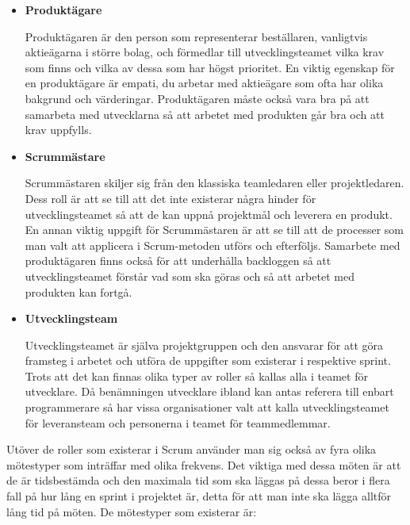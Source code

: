 \begin{itemize}
	\item \textbf{Produktägare}
	
	Produktägaren är den person som representerar beställaren, vanligtvis aktieägarna i större bolag, och förmedlar till utvecklingsteamet vilka krav som finns och vilka av dessa som har högst prioritet. En viktig egenskap för en produktägare är empati, du arbetar med aktieägare som ofta har olika bakgrund och värderingar. Produktägaren måste också vara bra på att samarbeta med utvecklarna så att arbetet med produkten går bra och att krav uppfylls.
	
	\item \textbf{Scrummästare}
	
	Scrummästaren skiljer sig från den klassiska teamledaren eller projektledaren. Dess roll är att se till att det inte existerar några hinder för utvecklingsteamet så att de kan uppnå projektmål och leverera en produkt. En annan viktig uppgift för Scrummästaren är att se till att de processer som man valt att applicera i Scrum-metoden utförs och efterföljs. Samarbete med produktägaren finns också för att underhålla backloggen så att utvecklingsteamet förstår vad som ska göras och så att arbetet med produkten kan fortgå.
	
	\item \textbf{Utvecklingsteam}
	
	Utvecklingsteamet är själva projektgruppen och den ansvarar för att göra framsteg i arbetet och utföra de uppgifter som existerar i respektive sprint. Trots att det kan finnas olika typer av roller så kallas alla i teamet för utvecklare. Då benämningen utvecklare ibland kan antas referera till enbart programmerare så har vissa organisationer valt att kalla utvecklingsteamet för leveransteam och personerna i teamet för teammedlemmar.	
\end{itemize}

Utöver de roller som existerar i Scrum använder man sig också av fyra olika mötestyper som inträffar med olika frekvens. Det viktiga med dessa möten är att de är tidsbestämda och den maximala tid som ska läggas på dessa beror i flera fall på hur lång en sprint i projektet är, detta för att man inte ska lägga alltför lång tid på möten. De mötestyper som existerar är:

